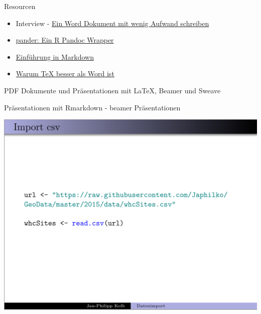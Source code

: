 \documentclass[ignorenonframetext,]{beamer}
\begin{document}
\begin{frame}{Resourcen}

\begin{itemize}
\item
  Interview -
  \href{https://www.r-statistics.com/2013/03/write-ms-word-document-using-r-with-as-little-overhead-as-possible/}{Ein
  Word Dokument mit wenig Aufwand schreiben}
\item
  \href{http://rapporter.github.io/pander/}{pander: Ein R Pandoc
  Wrapper}
\item
  \href{https://github.com/ctreffe/r-space/wiki/R-Markdown-Intro}{Einführung
  in Markdown}
\item
  \href{http://factorgrad.blogspot.de/2010/07/why-latex-is-superior-to-ms-word.html}{Warum
  TeX besser als Word ist}
\end{itemize}

\end{frame}

\begin{frame}{PDF Dokumente und Präsentationen mit LaTeX, Beamer und
Sweave}

\end{frame}

\begin{frame}{Präsentationen mit Rmarkdown - beamer Präsentationen}

\includegraphics{./tex2pdf.956/43e54ee751ab1c73b60a2b869af071d1e4aea5d5.png}

\end{frame}
\end{document}
